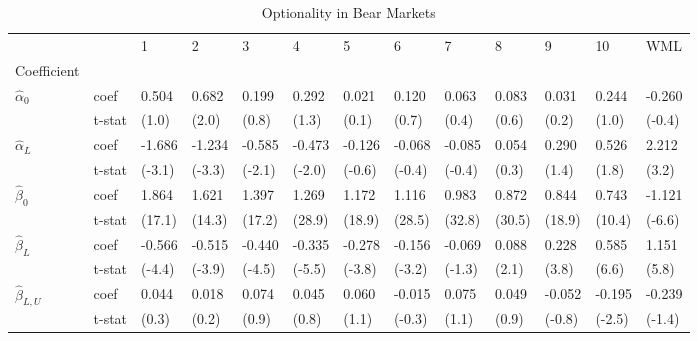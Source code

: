\documentclass{article}
\begin{document}
\begin{table}[htbp]
  \centering
  \caption{Optionality in Bear Markets}
  \label{tab:table_04_optionality_1}
  \begin{tabular}{lllllllllllll}
\toprule
 &  & 1 & 2 & 3 & 4 & 5 & 6 & 7 & 8 & 9 & 10 & WML \\
Coefficient &  &  &  &  &  &  &  &  &  &  &  &  \\
\midrule
\multirow[t]{2}{*}{$\hat{\alpha}_0$} & coef & 0.504 & 0.682 & 0.199 & 0.292 & 0.021 & 0.120 & 0.063 & 0.083 & 0.031 & 0.244 & -0.260 \\
 & t-stat & (1.0) & (2.0) & (0.8) & (1.3) & (0.1) & (0.7) & (0.4) & (0.6) & (0.2) & (1.0) & (-0.4) \\
\cline{1-13}
\multirow[t]{2}{*}{$\hat{\alpha}_L$} & coef & -1.686 & -1.234 & -0.585 & -0.473 & -0.126 & -0.068 & -0.085 & 0.054 & 0.290 & 0.526 & 2.212 \\
 & t-stat & (-3.1) & (-3.3) & (-2.1) & (-2.0) & (-0.6) & (-0.4) & (-0.4) & (0.3) & (1.4) & (1.8) & (3.2) \\
\cline{1-13}
\multirow[t]{2}{*}{$\hat{\beta}_0$} & coef & 1.864 & 1.621 & 1.397 & 1.269 & 1.172 & 1.116 & 0.983 & 0.872 & 0.844 & 0.743 & -1.121 \\
 & t-stat & (17.1) & (14.3) & (17.2) & (28.9) & (18.9) & (28.5) & (32.8) & (30.5) & (18.9) & (10.4) & (-6.6) \\
\cline{1-13}
\multirow[t]{2}{*}{$\hat{\beta}_L$} & coef & -0.566 & -0.515 & -0.440 & -0.335 & -0.278 & -0.156 & -0.069 & 0.088 & 0.228 & 0.585 & 1.151 \\
 & t-stat & (-4.4) & (-3.9) & (-4.5) & (-5.5) & (-3.8) & (-3.2) & (-1.3) & (2.1) & (3.8) & (6.6) & (5.8) \\
\cline{1-13}
\multirow[t]{2}{*}{$\hat{\beta}_{L,U}$} & coef & 0.044 & 0.018 & 0.074 & 0.045 & 0.060 & -0.015 & 0.075 & 0.049 & -0.052 & -0.195 & -0.239 \\
 & t-stat & (0.3) & (0.2) & (0.9) & (0.8) & (1.1) & (-0.3) & (1.1) & (0.9) & (-0.8) & (-2.5) & (-1.4) \\
\cline{1-13}
\bottomrule
\end{tabular}
\end{table}
\end{document}
